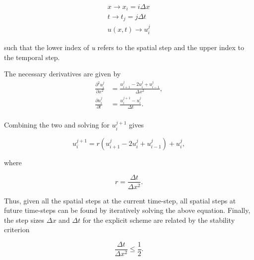\documentclass[multicolumn, 9pt]{extarticle}
\begin{document}
\begin{align*}
	x \rightarrow x_{i} = i\Delta x  \\
	t \rightarrow t_{j} = j \Delta t \\
	u(x, t)  \rightarrow u_{i}^{j}
\end{align*}

such that the lower index of \textit{u} refers to the spatial step and the upper index to the temporal step.

The necessary derivatives are given by
\begin{align*}
	\frac{\partial^2u_i^j}{\partial x^2} & = \frac{u_{i+1}^{j} - 2u_{i}^{j} + u_{i-1}^{j}}{\Delta x^{2}}, \\
	\frac{\partial u_i^j}{\partial t}    & = \frac{u_{i}^{j+1} - u_{i}^{j}}{\Delta t}.                    \\
\end{align*}

Combining the two and solving for $u_{i}^{j+1}$ gives

\begin{equation}\label{eq:euler}
	u_{i}^{j+1} = r(u_{i+1}^{j} - 2u_{i}^{j} + u_{i-1}^{j}) + u_{i}^{j},
\end{equation}

where

\begin{equation*}
	r = \frac{\Delta t}{\Delta x^{2}}.
\end{equation*}

Thus, given all the spatial steps at the current time-step, all spatial steps at future time-steps can be found by iteratively solving the above equation. Finally, the step sizes $\Delta x$ and $\Delta t$ for the explicit scheme are related by the stability criterion

\begin{equation}\label{eq:stability_crit}
	\frac{\Delta t}{\Delta x^{2}} \le \frac{1}{2}.
\end{equation}
\end{document}
